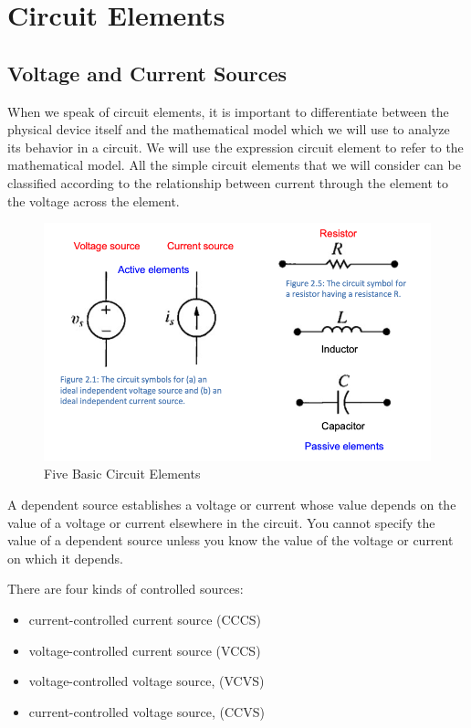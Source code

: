 \documentclass[14pt]{memoir}
\begin{document}
\chapter{Circuit Elements}

\section{Voltage and Current Sources}


When we speak of circuit elements, it is important to differentiate between the physical device itself and the mathematical model which we will use to analyze its behavior in a circuit. We will use the expression circuit element to refer to the mathematical model. All the simple circuit elements that we will consider can be classified according to the relationship between current through the element to the voltage across the element.

\begin{figure}[h]
\begin{center}
\includegraphics[scale=0.60]{fig/fig02_01.png}
\caption{Five Basic Circuit Elements}
\label{fig:f02_01}
\end{center}
\end{figure}

A dependent source establishes a voltage or current whose value depends on the value of a voltage or current elsewhere in the circuit. You cannot specify the value of a dependent source unless you know the value of the voltage or current on which it depends.

There are four kinds of controlled sources:
\begin{itemize}
\item current-controlled current source (CCCS)
\item voltage-controlled current source (VCCS)
\item voltage-controlled voltage source, (VCVS)
\item current-controlled voltage source, (CCVS)
\end{itemize}
\end{document}
